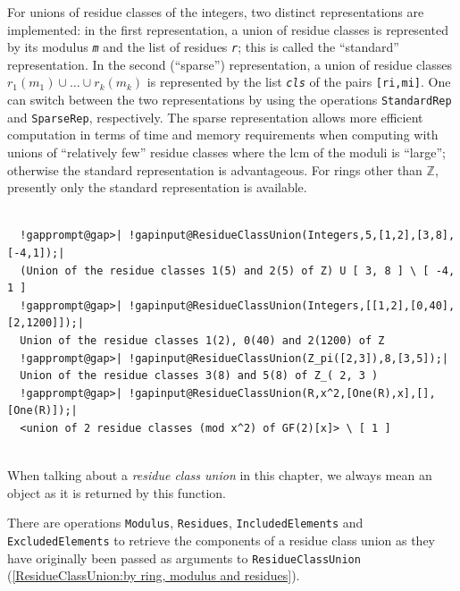 \documentclass[a4paper,11pt]{report}
\begin{document}
{{{ For unions of residue classes of the integers, two distinct representations
are implemented: in the first representation, a union of residue classes is
represented by its modulus \mbox{\texttt{\mdseries\slshape m}} and the list of residues \mbox{\texttt{\mdseries\slshape r}}; this is called the ``standard'' representation. In the second (``sparse'') representation, a union of residue classes $r_1(m_1) \cup \dots \cup r_k(m_k)$ is represented by the list \mbox{\texttt{\mdseries\slshape cls}} of the pairs \texttt{[r{\textunderscore}i,m{\textunderscore}i]}.   One can switch between the two representations by using the operations \texttt{StandardRep} and \texttt{SparseRep}, respectively. The sparse representation allows more efficient computation in
terms of time\texttt{} and memory requirements when computing with
unions of ``relatively few'' residue classes where the lcm of the moduli is ``large''; otherwise the standard representation is advantageous. For rings other than
{\ensuremath{\mathbb Z}}, presently only the standard representation is
available. 
\begin{Verbatim}[commandchars=!@|,fontsize=\small,frame=single,label=Example]
  
  !gapprompt@gap>| !gapinput@ResidueClassUnion(Integers,5,[1,2],[3,8],[-4,1]);|
  (Union of the residue classes 1(5) and 2(5) of Z) U [ 3, 8 ] \ [ -4, 1 ]
  !gapprompt@gap>| !gapinput@ResidueClassUnion(Integers,[[1,2],[0,40],[2,1200]]);|
  Union of the residue classes 1(2), 0(40) and 2(1200) of Z
  !gapprompt@gap>| !gapinput@ResidueClassUnion(Z_pi([2,3]),8,[3,5]);|
  Union of the residue classes 3(8) and 5(8) of Z_( 2, 3 )
  !gapprompt@gap>| !gapinput@ResidueClassUnion(R,x^2,[One(R),x],[],[One(R)]);|
  <union of 2 residue classes (mod x^2) of GF(2)[x]> \ [ 1 ]
  
\end{Verbatim}
 }

  When talking about a \emph{residue class union} in this chapter, we always mean an object as it is returned by this function. 

     There are operations \texttt{Modulus}, \texttt{Residues}, \texttt{IncludedElements} and \texttt{ExcludedElements} to retrieve the components of a residue class union as they have originally
been passed as arguments to \texttt{ResidueClassUnion} (\ref{ResidueClassUnion:by ring, modulus and residues}). 

}}
\end{document}
